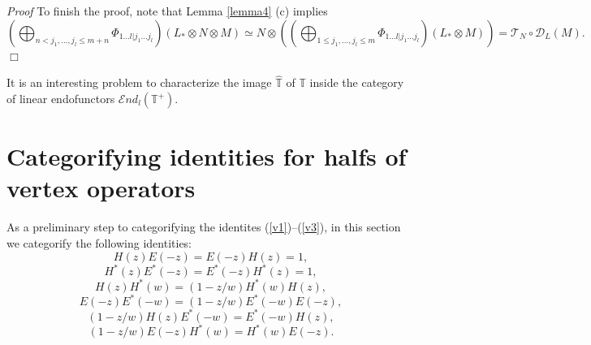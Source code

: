 \documentclass[11pt]{amsart}
\renewenvironment{proof}{ \emph{Proof}}{$\Box$}
\begin{document}
\begin{proof}
To finish the proof, note that  Lemma \ref {lemma4} (c) implies
$$\left(\bigoplus_{n<j_1,...,j_l\leq  m+n}\Phi_{1...l|j_1...j_l}\right)(L_*\otimes N\otimes M)\simeq 
N\otimes \left(\left(\bigoplus_{1\leq j_1,...,j_l\leq m}\Phi_{1...l|j_1...j_l} \right)(L_*\otimes M)\right)=
\mathcal T_{N}\circ \mathcal D_{L}(M).$$
\end{proof}


It is an interesting problem to characterize the image $\hat{\mathbb T}$ of $\mathbb T$ inside the category of linear endofunctors
$\mathcal{E}nd_l(\mathbb T^+)$. 

\section{Categorifying identities for halfs of vertex operators}

As a preliminary step to  categorifying the identites (\ref{v1})--(\ref{v3}),
in this section we categorify the following identities:
\begin{equation}\label{equ1}
H(z)E(-z)=E(-z)H(z)=1,
\end{equation}
\begin{equation}\label{equ2}
 H^*(z)E^*(-z)=E^*(-z)H^*(z)=1,
\end{equation}
\begin{equation}\label{equ3}
 H(z)H^*(w)=(1-z/w)H^*(w)H(z),
\end{equation}
\begin{equation}\label{equ4}
 E(-z)E^*(-w)=(1-z/w)E^*(-w)E(-z),
\end{equation}
\begin{equation}\label{equ5}
 (1-z/w)H(z)E^*(-w)=E^*(-w)H(z),
\end{equation}
\begin{equation}\label{equ6}
 (1-z/w)E(-z)H^*(w)=H^*(w)E(-z).
\end{equation}
\end{document}

